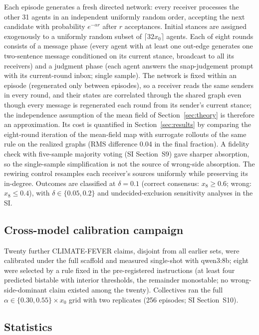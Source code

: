 \documentclass[9pt,twocolumn]{extarticle}
\begin{document}
Each episode generates a fresh directed network: every receiver processes the
other 31 agents in an independent uniformly random order, accepting the next
candidate with probability $e^{-\alpha r}$ after $r$ acceptances. Initial
stances are assigned exogenously to a uniformly random subset of
$\lceil 32 x_0 \rceil$ agents. Each of eight rounds consists of a message
phase (every agent with at least one out-edge generates one two-sentence
message conditioned on its current stance, broadcast to all its receivers)
and a judgment phase (each agent answers the snap-judgement prompt with its
current-round inbox; single sample). The network is fixed within an episode
(regenerated only between episodes), so a receiver reads the same senders in
every round, and their states are correlated through the shared graph even
though every message is regenerated each round from its sender's current
stance; the independence assumption of the mean field of
Section~\ref{sec:theory} is therefore an approximation. Its cost is
quantified in Section~\ref{sec:results} by comparing the eight-round
iteration of the mean-field map with surrogate rollouts of the same rule on
the realized graphs (RMS difference 0.04 in the final fraction). A fidelity check with five-sample majority voting (SI Section~S9) gave
sharper absorption, so the single-sample simplification is not the source
of wrong-side absorption. The rewiring control resamples each receiver's sources uniformly
while preserving its in-degree. Outcomes are classified at $\delta = 0.1$
(correct consensus: $x_8 \ge 0.6$; wrong: $x_8 \le 0.4$), with
$\delta \in \{0.05, 0.2\}$ and undecided-exclusion sensitivity analyses in
the SI.

\subsection*{Cross-model calibration campaign}

Twenty further CLIMATE-FEVER claims, disjoint from all earlier sets, were
calibrated under the full scaffold and measured single-shot with qwen3:8b;
eight were selected by a rule fixed in the pre-registered instructions (at
least four predicted bistable with interior thresholds, the remainder
monostable; no wrong-side-dominant claim existed among the twenty).
Collectives ran the full $\alpha \in \{0.30, 0.55\} \times x_0$ grid with two
replicates (256 episodes; SI Section~S10).

\subsection*{Statistics}
\end{document}
